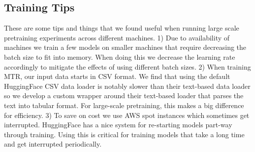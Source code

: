 \documentclass{article}
\begin{document}
\subsection{Training Tips}
These are some tips and things that we found useful when running large scale pretraining experiments across different machines. 
1) Due to availability of machines we train a few models on smaller machines that require decreasing the batch size to fit into memory. When doing this we decrease the learning rate accordingly to mitigate the effects of using different batch sizes.
2) When training MTR, our input data starts in CSV format. We find that using the default HuggingFace CSV data loader is notably slower than their text-based data loader so we develop a custom wrapper around their text-based loader that parses the text into tabular format. For large-scale pretraining, this makes a big difference for efficiency.
3) To save on cost we use AWS spot instances which sometimes get interrupted. HuggingFace has a nice system for re-starting models part-way through training. Using this is critical for training models that take a long time and get interrupted periodically.
\end{document}
